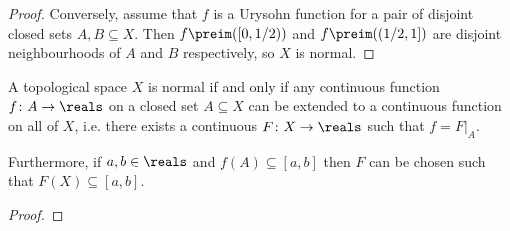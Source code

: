 \documentclass[article, a4paper, 11pt, oneside]{memoir}
\numberwithin{equation}{chapter}
\begin{document}
\begin{proof}
    Conversely, assume that $f$ is a Urysohn function for a pair of disjoint closed sets $A,B \subseteq X$. Then $f\preim([0,1/2))$ and $f\preim((1/2,1])$ are disjoint neighbourhoods of $A$ and $B$ respectively, so $X$ is normal.
\end{proof}


\begin{theorem}
    \label{thm:Tietze-extension}
    A topological space $X$ is normal if and only if any continuous function $f \colon A \to \reals$ on a closed set $A \subseteq X$ can be extended to a continuous function on all of $X$, i.e. there exists a continuous $F \colon X \to \reals$ such that $f = F|_A$.

    Furthermore, if $a,b \in \reals$ and $f(A) \subseteq [a,b]$ then $F$ can be chosen such that $F(X) \subseteq [a,b]$.
\end{theorem}

\begin{proof}
    
\end{proof}


\nocite{*}

\printbibliography
\end{document}
